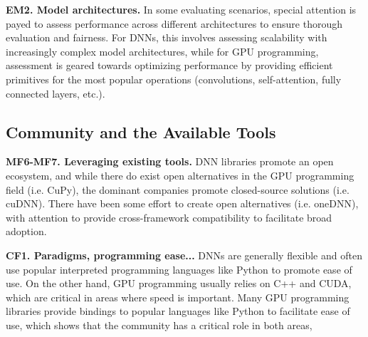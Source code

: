 \textbf{EM2. Model architectures.}
In some evaluating scenarios, special attention is payed to assess performance across different
architectures to ensure thorough evaluation and fairness. For DNNs, this involves assessing
scalability with increasingly complex model architectures, while for GPU programming, assessment is
geared towards optimizing performance by providing efficient primitives for the most popular
operations (convolutions, self-attention, fully connected layers, etc.).

\subsection*{Community and the Available Tools}


\textbf{MF6-MF7. Leveraging existing tools.}
DNN libraries promote an open ecosystem, and while there do exist open alternatives in the GPU programming field (i.e. CuPy),
the dominant companies promote closed-source solutions (i.e. cuDNN). There have been some effort to create
open alternatives (i.e. oneDNN), with attention to provide cross-framework compatibility to facilitate broad adoption.


\textbf{CF1. Paradigms, programming ease...}
DNNs are generally flexible and often use popular interpreted programming languages like Python to
promote ease of use. On the other hand, GPU programming usually relies on C++ and CUDA, which are
critical in areas where speed is important. Many GPU programming libraries provide bindings to
popular languages like Python to facilitate ease of use, which shows that the community has a critical
role in both areas,

